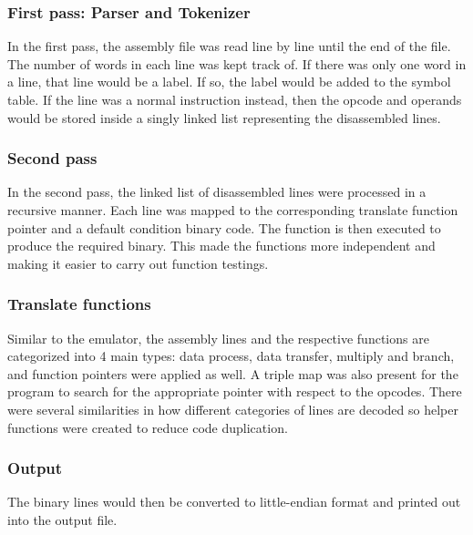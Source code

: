 \documentclass[11pt]{article}
\begin{document}
\subsubsection{First pass: Parser and Tokenizer}
In the first pass, the assembly file was read line by line until the end of the file. The number of words in each line was kept track of. If there was only one word in a line, that line would be a label. If so, the label would be added to the symbol table. If the line was a normal instruction instead, then the opcode and operands would be stored inside a singly linked list representing the disassembled lines.
\subsubsection{Second pass}
In the second pass, the linked list of disassembled lines were processed in a recursive manner. Each line was mapped to the corresponding translate function pointer and a default condition binary code. The function is then executed to produce the required binary. This made the functions more independent and making it easier to carry out function testings.
    
\subsubsection{Translate functions}
Similar to the emulator, the assembly lines and the respective functions are categorized into 4 main types: data process, data transfer, multiply and branch, and function pointers were applied as well. A triple map was also present for the program to search for the appropriate pointer with respect to the opcodes. There were several similarities in how different categories of lines are decoded so helper functions were created to reduce code duplication.

\subsubsection{Output}
The binary lines would then be converted to little-endian format and printed out into the output file.
    
\end{document}
